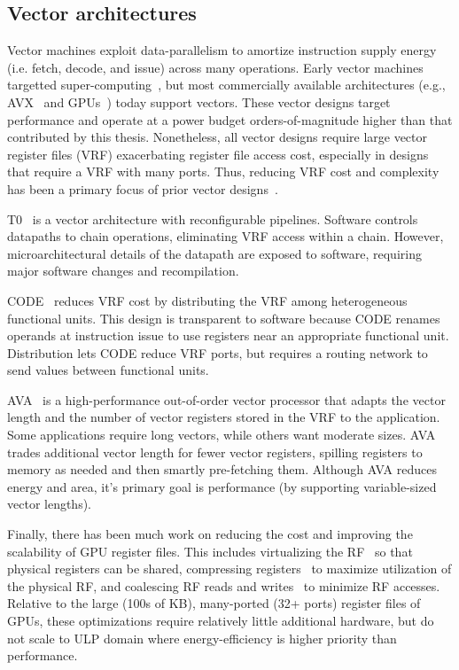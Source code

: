 \subsection{Vector architectures}
Vector machines exploit data-parallelism to amortize instruction supply energy (i.e. fetch, decode, and issue) across many operations.
% 
Early vector machines targetted super-computing~\cite{cray_patent}, but most commercially available architectures (e.g., AVX~\cite{avx} and GPUs~\cite{fermi}) today support vectors.
% 
These vector designs target performance and operate at a power budget
orders-of-magnitude higher than that contributed by this thesis.
% 
Nonetheless, all vector designs require large vector register files (VRF)
exacerbating register file access cost, especially in designs that require a
VRF with many ports. 
% 
Thus, reducing VRF cost and complexity has been a primary focus of prior vector
designs~\cite{asanovic1996t0,kozyrakis2003overcoming}.

T0~\cite{asanovic1996t0,wawrzynek1996spert} is a vector architecture with
reconfigurable pipelines. 
% 
Software controls datapaths to chain operations,
eliminating VRF access within a chain.  
% 
However, microarchitectural details of
the datapath are exposed to software, requiring major software changes and
recompilation.

CODE~\cite{kozyrakis2003overcoming} reduces VRF cost by distributing the VRF
among heterogeneous functional units.
% 
This design is transparent to software 
because CODE renames operands at instruction issue
to use registers near an appropriate functional unit.
% 
Distribution lets CODE reduce VRF ports, but requires a routing network
to send values between functional units.

AVA~\cite{lazo2021adaptable} is a high-performance out-of-order vector processor that adapts the vector length and the number of vector registers stored in the VRF to the application.
% 
Some applications require long vectors, while others want moderate sizes.
% 
AVA trades additional vector length for fewer vector registers, spilling registers to memory as needed and then smartly pre-fetching them.
% 
Although AVA reduces energy and area, it's primary goal is performance (by supporting variable-sized vector lengths).

Finally, there has been much work on reducing the cost and improving the scalability of GPU register files.
% 
This includes virtualizing the RF~\cite{jeon2015gpu,vijaykumar2016zorua} so that physical registers can be shared, compressing registers~\cite{lee2015warped} to maximize utilization of the physical RF, and coalescing RF reads and writes~\cite{asghari2019corf} to minimize RF accesses. 
% 
Relative to the large (100s of KB), many-ported (32+ ports) register files of GPUs, these optimizations require relatively little additional hardware, but do not scale to ULP domain where energy-efficiency is higher priority than performance.

